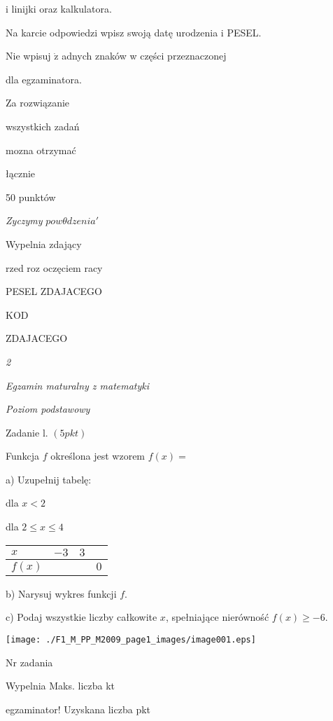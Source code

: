 \documentclass[a4paper,12pt]{article}
\begin{document}
i linijki oraz kalkulatora.

Na karcie odpowiedzi wpisz swoją datę urodzenia i PESEL.

Nie wpisuj $\dot{\mathrm{z}}$ adnych znaków w części przeznaczonej

dla egzaminatora.

Za rozwiązanie

wszystkich zadań

mozna otrzymać

łącznie

50 punktów

{\it Zyczymy} $pow\theta dzenia'$

Wypelnia zdający

rzed roz oczęciem racy

PESEL ZDAJACEGO

KOD

ZDAJACEGO




{\it 2}

{\it Egzamin maturalny z matematyki}

{\it Poziom podstawowy}

Zadanie l. $(5pkt)$

Funkcja $f$ określona jest wzorem $f(x)=$

a) Uzupełnij tabelę:

dla $x<2$

dla $2\leq x\leq 4$
\begin{center}
\begin{tabular}{|l|l|l|l|}
\hline
\multicolumn{1}{|l|}{$x$}&	\multicolumn{1}{|l|}{ $-3$}&	\multicolumn{1}{|l|}{ $3$}&	\multicolumn{1}{|l|}{}	\\
\hline
\multicolumn{1}{|l|}{ $f(x)$}&	\multicolumn{1}{|l|}{}&	\multicolumn{1}{|l|}{}&	\multicolumn{1}{|l|}{ $0$}	\\
\hline
\end{tabular}

\end{center}
b) Narysuj wykres funkcji $f.$

c) Podaj wszystkie liczby całkowite $x$, spełniające nierówność $f(x)\geq-6.$
\begin{center}
\texttt{[image: ./F1\_M\_PP\_M2009\_page1\_images/image001.eps]}
\end{center}
Nr zadania

Wypelnia Maks. liczba kt

egzaminator! Uzyskana liczba pkt
\end{document}
